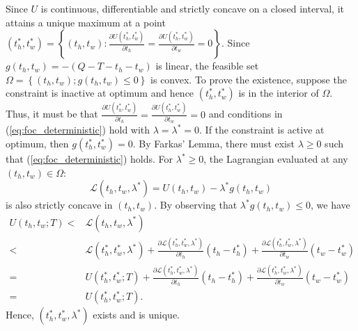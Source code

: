 \documentclass[12pt,a4paper,british]{article}
\makeatletter
\theoremstyle{definition}
\theoremstyle{plain}
\newenvironment{proof}[1][\proofname]{\par
    \normalfont\topsep6\p@\@plus6\p@\relax
    \trivlist
    \itemindent\parindent
    \item[\hskip\labelsep
          \scshape
      #1]\ignorespaces
  }{%
    \endtrivlist\@endpefalse
  }
\providecommand{\proofname}{Proof}
\theoremstyle{plain}
\makeatother
\begin{document}
\begin{proof}
Since $U$ is continuous, differentiable and strictly concave on a
closed interval, it attains a unique maximum at a point $\left(t_{h}^{\ast},t_{w}^{\ast}\right)=\left\{ \left(t_{h},t_{w}\right):\frac{\partial U\left(t_{h}^{\ast},t_{w}^{\ast}\right)}{\partial t_{h}}=\frac{\partial U\left(t_{h}^{\ast},t_{w}^{\ast}\right)}{\partial t_{w}}=0\right\} $.
Since $g\left(t_{h},t_{w}\right)=-\left(Q-T-t_{h}-t_{w}\right)$ is
linear, the feasible set $\Omega=\left\{ \left(t_{h},t_{w}\right);g\left(t_{h},t_{w}\right)\leq0\right\} $
is convex. To prove the existence, suppose the constraint is inactive
at optimum and hence $\left(t_{h}^{\ast},t_{w}^{\ast}\right)$ is
in the interior of $\Omega$. Thus, it must be that $\frac{\partial U\left(t_{h}^{\ast},t_{w}^{\ast}\right)}{\partial t_{h}}=\frac{\partial U\left(t_{h}^{\ast},t_{w}^{\ast}\right)}{\partial t_{w}}=0$
and conditions in (\ref{eq:foc_deterministic}) hold with $\lambda=\lambda^{\ast}=0$.
If the constraint is active at optimum, then $g\left(t_{h}^{\ast},t_{w}^{\ast}\right)=0$.
By Farkas' Lemma, there must exist $\lambda\geq0$ such that (\ref{eq:foc_deterministic})
holds. For $\lambda^{\ast}\geq0$, the Lagrangian evaluated at any
$\left(t_{h},t_{w}\right)\in\Omega$: 
\[
\mathcal{L}\left(t_{h},t_{w},\lambda^{\ast}\right)=U\left(t_{h},t_{w}\right)-\lambda^{\ast}g\left(t_{h},t_{w}\right)
\]
is also strictly concave in $\left(t_{h},t_{w}\right)$. By observing
that $\lambda^{\ast}g\left(t_{h},t_{w}\right)\leq0$, we have
\begin{align*}
U\left(t_{h},t_{w};T\right)< & \mathcal{L}\left(t_{h},t_{w},\lambda^{\ast}\right)\\
< & \mathcal{L}\left(t_{h}^{\ast},t_{w}^{\ast},\lambda^{\ast}\right)+\frac{\partial\mathcal{L}\left(t_{h}^{\ast},t_{w}^{\ast},\lambda^{\ast}\right)}{\partial t_{h}}\left(t_{h}-t_{h}^{\ast}\right)+\frac{\partial\mathcal{L}\left(t_{h}^{\ast},t_{w}^{\ast},\lambda^{\ast}\right)}{\partial t_{w}}\left(t_{w}-t_{w}^{\ast}\right)\\
= & U\left(t_{h}^{\ast},t_{w}^{\ast};T\right)+\frac{\partial\mathcal{L}\left(t_{h}^{\ast},t_{w}^{\ast},\lambda^{\ast}\right)}{\partial t_{h}}\left(t_{h}-t_{h}^{\ast}\right)+\frac{\partial\mathcal{L}\left(t_{h}^{\ast},t_{w}^{\ast},\lambda^{\ast}\right)}{\partial t_{w}}\left(t_{w}-t_{w}^{\ast}\right)\\
= & U\left(t_{h}^{\ast},t_{w}^{\ast};T\right).
\end{align*}
Hence, $\left(t_{h}^{\ast},t_{w}^{\ast},\lambda^{\ast}\right)$ exists
and is unique.
\end{proof}
\end{document}
